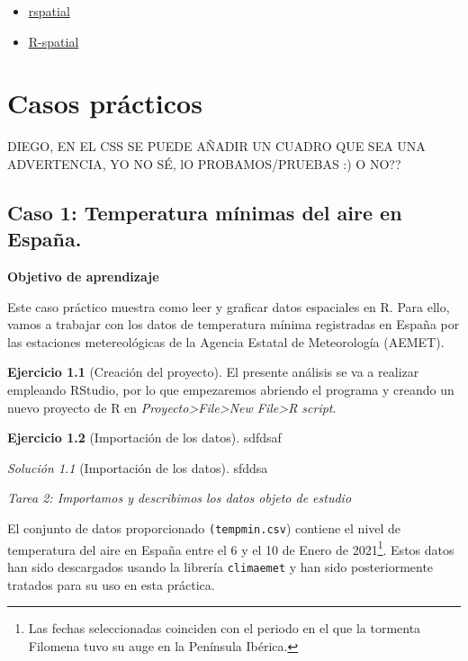 \documentclass[
]{report}
\providecommand{\tightlist}{%
  \setlength{\itemsep}{0pt}\setlength{\parskip}{0pt}}
\theoremstyle{definition}
\theoremstyle{definition}
\theoremstyle{definition}
\newtheorem{exercise}{Ejercicio}[chapter]
\theoremstyle{definition}
\theoremstyle{remark}
\newtheorem*{solution}{Solución}
\begin{document}
\begin{itemize}
\tightlist
\item
  \href{https://rspatial.org/}{rspatial}
\item
  \href{https://r-spatial.org/projects/}{R-spatial}
\end{itemize}

\hypertarget{caos}{%
\chapter{Casos prácticos}\label{caos}}

DIEGO, EN EL CSS SE PUEDE AÑADIR UN CUADRO QUE SEA UNA ADVERTENCIA, YO NO SÉ,
lO PROBAMOS/PRUEBAS :) O NO??

\hypertarget{caso-1-temperatura-muxednimas-del-aire-en-espauxf1a.}{%
\section{Caso 1: Temperatura mínimas del aire en España.}\label{caso-1-temperatura-muxednimas-del-aire-en-espauxf1a.}}

\textbf{Objetivo de aprendizaje}

Este caso práctico muestra como leer y graficar datos espaciales en R. Para
ello, vamos a trabajar con los datos de temperatura mínima registradas en España
por las estaciones metereológicas de la Agencia Estatal de Meteorología (AEMET).

\begin{exercise}[Creación del proyecto]
\protect\hypertarget{exr:ex-crea}{}\label{exr:ex-crea}El presente análisis se va a realizar empleando RStudio, por lo que empezaremos
abriendo el programa y creando un nuevo proyecto de R en \emph{Proyecto\textgreater File\textgreater New File\textgreater R
script}.
\end{exercise}

\begin{exercise}[Importación de los datos]
\protect\hypertarget{exr:ex-import}{}\label{exr:ex-import}sdfdsaf
\end{exercise}

\begin{solution}[Importación de los datos]
sfddsa
\end{solution}

\emph{Tarea 2: Importamos y describimos los datos objeto de estudio}

El conjunto de datos proporcionado \texttt{(tempmin.csv}) contiene el nivel de
temperatura del aire en España entre el 6 y el 10 de Enero de
2021\footnote{Las fechas seleccionadas coinciden con el periodo en el que
  la tormenta Filomena tuvo su auge en la Península Ibérica.}. Estos datos han sido descargados usando la librería
\texttt{climaemet} \citep{R-climaemet} y han sido posteriormente tratados para su uso en
esta práctica.
\end{document}
